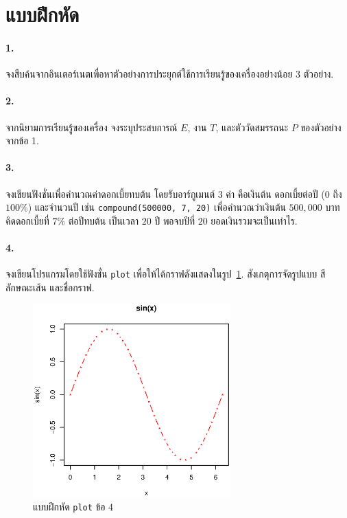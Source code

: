 \section{แบบฝึกหัด}

\paragraph{1.} จงสืบค้นจากอินเตอร์เนตเพื่อหาตัวอย่างการประยุกต์ใช้การเรียนรู้ของเครื่องอย่างน้อย $3$ ตัวอย่าง.

\paragraph{2.} จากนิยามการเรียนรู้ของเครื่อง จงระบุประสบการณ์ $E$, งาน $T$, และตัววัดสมรรถนะ $P$ ของตัวอย่างจากข้อ 1.

\paragraph{3.} จงเขียนฟังชั่นเพื่อคำนวณค่าดอกเบี้ยทบต้น โดยรับอาร์กูเมนต์ $3$ ค่า คือเงินต้น ดอกเบี้ยต่อปี ($0$ ถึง $100\%$) และจำนวนปี เช่น
 \verb|compound(500000, 7, 20)| เพื่อคำนวณว่าเงินต้น $500,000$ บาท คิดดอกเบี้ยที่ $7\%$ ต่อปีทบต้น เป็นเวลา $20$ ปี พอจบปีที่ $20$ ยอดเงินรวมจะเป็นเท่าไร.

\paragraph{4.} จงเขียนโปรแกรมโดยใช้ฟังชั่น \texttt{plot} เพื่อให้ได้กราฟดังแสดงในรูป~\ref{fig: R plot ex1}.
สังเกตุการจัดรูปแบบ สี ลักษณะเส้น และชื่อกราฟ.

%
\begin{figure}
\begin{center}
\includegraphics[width=3.0in]
{01Intro/RplotEx1.eps}
\end{center}
\caption{แบบฝึกหัด \texttt{plot} ข้อ 4}
\label{fig: R plot ex1}
\end{figure}
%

